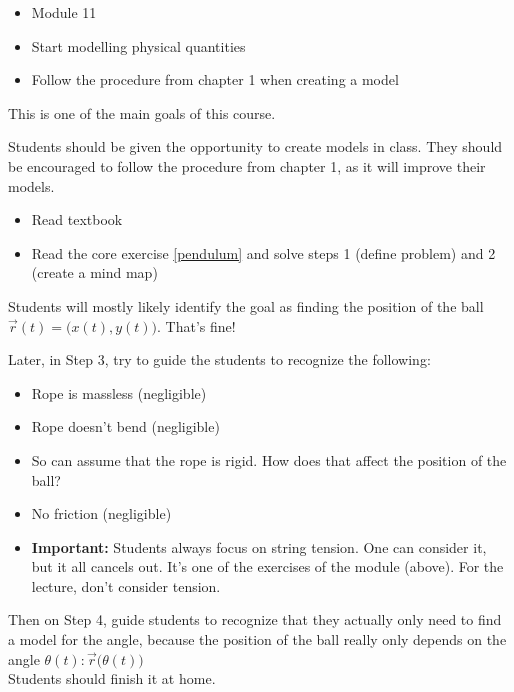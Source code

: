 \begin{lesson}

	\begin{itemize}
		\item Module 11
	\end{itemize}

	\begin{itemize}
		\item Start modelling physical quantities
		\item Follow the procedure from chapter 1 when creating a model
	\end{itemize}
	

This is one of the main goals of this course. 

Students should be given the opportunity to create models in class. They should be encouraged to follow the procedure from chapter 1, as it will improve their models.


\begin{itemize}
	\item Read textbook
	\item Read the core exercise \ref{pendulum} and solve steps 1 (define problem) and 2 (create a mind map)
\end{itemize}

\end{lesson}






\begin{annotation}
	\begin{goals}
		Students will mostly likely identify the goal as finding the position of the ball $\vec{r}(t) = \big( x(t) , y(t) \big)$. That's fine!
		
		Later, in Step 3, try to guide the students to recognize the following:
		\begin{itemize}
			\item Rope is massless (negligible)
			\item Rope doesn't bend (negligible)
			\item So can assume that the rope is rigid. How does that affect the position of the ball?
			\item No friction (negligible)
			\item \textbf{Important:} Students always focus on string tension. One can consider it, but it all cancels out. It's one of the exercises of the module (above). For the lecture, don't consider tension.
		\end{itemize}
		
		Then on Step 4, guide students to recognize that they actually only need to find a model for the angle, because the position of the ball really only depends on the angle $\theta(t): \vec{r}\big(\theta(t)\big)$ \\

		Students should finish it at home.				
	\end{goals}
\end{annotation}

